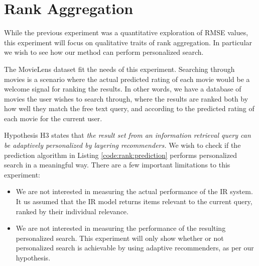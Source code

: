 \section{Rank Aggregation}


\afterpage{\clearpage}

While the previous experiment was a quantitative exploration of RMSE values,
this experiment will focus on qualitative traits of rank aggregation.
In particular we wish to see how our method can perform personalized search.

The MovieLens dataset fit the needs of this experiment.
Searching through movies is a scenario where the actual predicted
rating of each movie would be a welcome signal for ranking the results.
In other words, we have a database of movies the user wishes to search through,
where the results are ranked both by how well they match the free text query,
and according to the predicted rating of each movie for the current user.

Hypothesis H3 states that 
{
  \itshape
  the result set from an information retrieval query
  can be adaptively personalized by layering recommenders.
}
We wish to check if the prediction algorithm
in Listing \ref{code:rank:prediction} performs personalized search
in a meaningful way.
There are a few important limitations to this experiment:

\begin{itemize}
  \item 
    We are not interested in measuring the actual performance of the IR system.
    It us assumed that the IR model returns items relevant to the current query,
    ranked by their individual relevance.
  \item
    We are not interested in measuring the performance of the resulting personalized search.
    This experiment will only show whether or not personalized search is achievable
    by using adaptive recommenders, as per our hypothesis.
\end{itemize}

